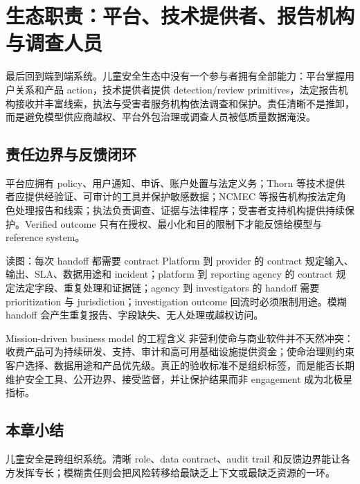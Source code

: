 \section{生态职责：平台、技术提供者、报告机构与调查人员}

最后回到端到端系统。儿童安全生态中没有一个参与者拥有全部能力：平台掌握用户关系和产品 action，技术提供者提供 detection/review primitives，法定报告机构接收并丰富线索，执法与受害者服务机构依法调查和保护。责任清晰不是推卸，而是避免模型供应商越权、平台外包治理或调查人员被低质量数据淹没。

\subsection{责任边界与反馈闭环}

平台应拥有 policy、用户通知、申诉、账户处置与法定义务；Thorn 等技术提供者应提供经验证、可审计的工具并保护敏感数据；NCMEC 等报告机构按法定角色处理报告和线索；执法负责调查、证据与法律程序；受害者支持机构提供持续保护。Verified outcome 只有在授权、最小化和目的限制下才能反馈给模型与 reference system。


\begin{knowledgebox}{读图：每次 handoff 都需要 contract}
Platform 到 provider 的 contract 规定输入、输出、SLA、数据用途和 incident；platform 到 reporting agency 的 contract 规定法定字段、重复处理和证据链；agency 到 investigators 的 handoff 需要 prioritization 与 jurisdiction；investigation outcome 回流时必须限制用途。模糊 handoff 会产生重复报告、字段缺失、无人处理或越权访问。
\end{knowledgebox}

\begin{importantbox}{Mission-driven business model 的工程含义}
非营利使命与商业软件并不天然冲突：收费产品可为持续研发、支持、审计和高可用基础设施提供资金；使命治理则约束客户选择、数据用途和产品优先级。真正的验收标准不是组织标签，而是能否长期维护安全工具、公开边界、接受监督，并让保护结果而非 engagement 成为北极星指标。
\end{importantbox}


\subsection{本章小结}

儿童安全是跨组织系统。清晰 role、data contract、audit trail 和反馈边界能让各方发挥专长；模糊责任则会把风险转移给最缺乏上下文或最缺乏资源的一环。

